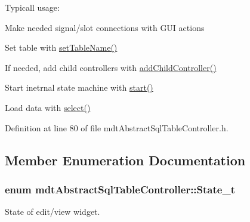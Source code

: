 Typicall usage\-:
\begin{DoxyItemize}
\item Make needed signal/slot connections with G\-U\-I actions
\item Set table with \hyperlink{classmdt_abstract_sql_table_controller_a5a94417dc46a7dc6de8b5ba0593494a7}{set\-Table\-Name()}
\item If needed, add child controllers with \hyperlink{classmdt_abstract_sql_table_controller_a448966fc2696cc2cef31f4663ccde662}{add\-Child\-Controller()}
\item Start inetrnal state machine with \hyperlink{classmdt_abstract_sql_table_controller_a06b594e9ebed9417ab15edcddaf0f05b}{start()}
\item Load data with \hyperlink{classmdt_abstract_sql_table_controller_ae26ede862ac54ece9243b264ea22cefb}{select()} 
\end{DoxyItemize}

Definition at line 80 of file mdt\-Abstract\-Sql\-Table\-Controller.\-h.



\subsection{Member Enumeration Documentation}
\hypertarget{classmdt_abstract_sql_table_controller_a63536182561f551ccb7616e1786793cd}{
\subsubsection[{State\-\_\-t}]{\setlength{\rightskip}{0pt plus 5cm}enum {\bf mdt\-Abstract\-Sql\-Table\-Controller\-::\-State\-\_\-t}}}\label{classmdt_abstract_sql_table_controller_a63536182561f551ccb7616e1786793cd}


State of edit/view widget. 

